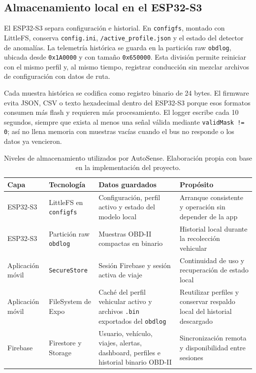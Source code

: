 \documentclass[12pt,letterpaper]{report}
\begin{document}
\subsection{Almacenamiento local en el ESP32-S3}

El ESP32-S3 separa configuración e historial. En \texttt{configfs}, montado con LittleFS, conserva \texttt{config.ini}, \texttt{/active\_profile.json} y el estado del detector de anomalías. La telemetría histórica se guarda en la partición raw \texttt{obdlog}, ubicada desde \texttt{0x1A0000} y con tamaño \texttt{0x650000}. Esta división permite reiniciar con el mismo perfil y, al mismo tiempo, registrar conducción sin mezclar archivos de configuración con datos de ruta.

Cada muestra histórica se codifica como registro binario de 24 bytes. El firmware evita JSON, CSV o texto hexadecimal dentro del ESP32-S3 porque esos formatos consumen más flash y requieren más procesamiento. El logger escribe cada 10 segundos, siempre que exista al menos una señal válida mediante \texttt{validMask != 0}; así no llena memoria con muestras vacías cuando el bus no responde o los datos ya vencieron.

\begin{table}[!htbp]
\centering
\small
\caption{Niveles de almacenamiento utilizados por AutoSense. Elaboración propia con base en la implementación del proyecto.}
\label{tab:storage-layers}
\setlength{\tabcolsep}{3pt}
\begin{tabular}{@{}p{} p{} p{} p{}@{}}
\toprule
\textbf{Capa} & \textbf{Tecnología} & \textbf{Datos guardados} & \textbf{Propósito} \\
\midrule
ESP32-S3 & LittleFS en \texttt{configfs} & Configuración, perfil activo y estado del modelo local & Arranque consistente y operación sin depender de la app \\
ESP32-S3 & Partición raw \texttt{obdlog} & Muestras OBD-II compactas en binario & Historial local durante la recolección vehicular \\
Aplicación móvil & \texttt{SecureStore} & Sesión Firebase y sesión activa de viaje & Continuidad de uso y recuperación de estado local \\
Aplicación móvil & FileSystem de Expo & Caché del perfil vehicular activo y archivos \texttt{.bin} exportados del \texttt{obdlog} & Reutilizar perfiles y conservar respaldo local del historial descargado \\
Firebase & Firestore y Storage & Usuario, vehículo, viajes, alertas, dashboard, perfiles e historial binario OBD-II & Sincronización remota y disponibilidad entre sesiones \\
\bottomrule
\end{tabular}
\end{table}
\end{document}
